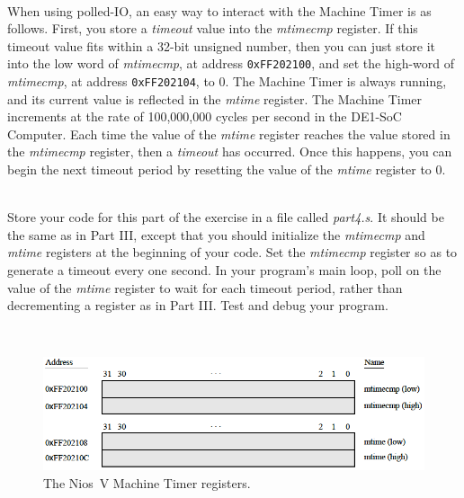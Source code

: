 \documentclass[epsfig,10pt,fullpage]{article}
\newcommand{\CommonDocsPath}{../../../../common/docs}
\begin{document}
~\\
\noindent
When using polled-IO, an easy way to interact with the Machine Timer is as follows. First, you
store a {\it timeout} value into the {\it mtimecmp} register. If this timeout value fits 
within a 32-bit unsigned number, then you can just store it into the low word of {\it mtimecmp}, 
at address \texttt{0xFF202100}, and set the high-word of {\it mtimecmp}, at 
address \texttt{0xFF202104}, to 0. The Machine Timer is always running, and its 
current value is reflected in the {\it mtime} register. The Machine Timer increments at
the rate of 100,000,000 cycles per second in the DE1-SoC Computer. Each time the
value of the {\it mtime} register reaches the value stored in the {\it mtimecmp} register, 
then a {\it timeout} has occurred. Once this happens, you can begin the next timeout period 
by resetting the value of the {\it mtime} register to 0.

~\\
\noindent
Store your code for this part of the exercise in a file called {\it part4.s}. It should be
the same as in Part III, except that you should initialize the {\it mtimecmp} and {\it
mtime} registers at the beginning of your code. Set the {\it mtimecmp} register so as
to generate a timeout every one second. 
In your program's main loop, poll on the value of the {\it mtime} register to wait for each 
timeout period, rather than decrementing a register as in Part III. Test and debug
your program.

~\\
\begin{figure}[htb]
	\begin{center}
	\includegraphics[scale=.55]{figures/figuretimer.png}
	\end{center}
	\caption{The Nios~V Machine Timer registers.}
\label{fig:timer}
\end{figure}


\end{document}
